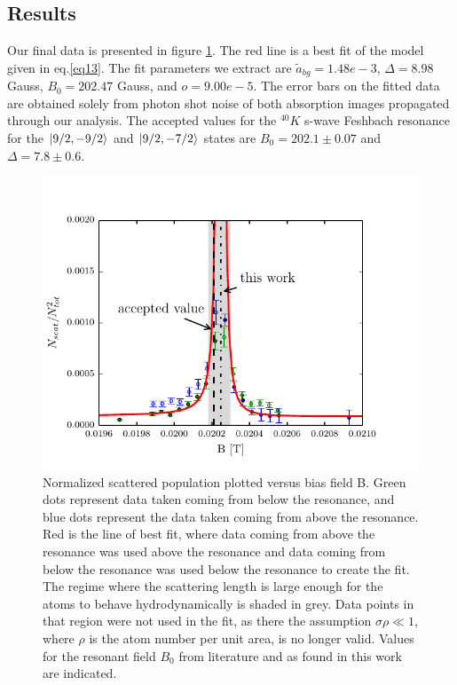 \documentclass[12pt]{iopart}
\begin{document}
\subsection{Results}
Our final data is presented in figure \ref{fig:fittedFractions}. The red line is a best fit of the model given in eq.\ref{eq13}. The fit parameters we extract are $\tilde{a}_{bg}=1.48e-3$, $\Delta = 8.98$ Gauss, $B_0 = 202.47$ Gauss, and $o=9.00e-5$. The error bars on the fitted data are obtained solely from photon shot noise of both absorption images propagated through our analysis.
The accepted values for the $^{40}K$ s-wave Feshbach resonance for the  $\mathinner{|{9/2,-9/2}\rangle}$ and $\mathinner{|{9/2,-7/2}\rangle}$ states are $B_0=202.1\pm0.07$ and $\Delta=7.8\pm0.6$. 
\begin{figure}
	\includegraphics{figure11.pdf}
\caption{Normalized scattered population plotted versus bias field B. Green dots represent data taken coming from below the resonance, and blue dots represent the data taken coming from above the resonance. Red is the line of best fit, where data coming from above the resonance was used above the resonance and data coming from below the resonance was used below the resonance to create the fit. The regime where the scattering length is large enough for the atoms to behave hydrodynamically is shaded in grey. Data points in that region were not used in the fit, as there the assumption $\sigma\rho\ll1$, where $\rho$ is the atom number per unit area, is no longer valid. Values for the resonant field $B_0$ from literature and as found in this work are indicated.    }  
\label{fig:fittedFractions}
\end{figure}
\end{document}
